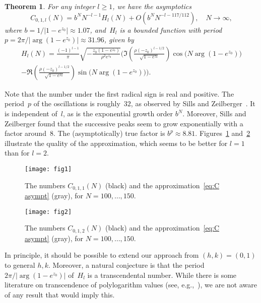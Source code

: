 \documentclass[a4paper]{amsart}
\newtheorem{theorem}{Theorem}
\begin{document}
\begin{theorem}\label{thm:main}
    For any integer $l\geq1$, we have the asymptotics
    \begin{equation}\label{eq:C asympt}
        C_{0,1,l}(N) = b^N N^{-l-1} H_l(N) + O(b^N N^{-l-117/112}), \quad N\to\infty, 
    \end{equation}
    where $b=1/|1-e^{z_0}|\approx 1.07$, and~$H_l$ is a bounded function with period
   $p=2\pi/|\arg(1-e^{z_0})|\approx 31.96$, given by
   \begin{multline*}
       H_l(N) = \frac{(-1)^{l-1}}{\pi} 
       \sqrt{-\frac {z_0(1-e^{z_0})}{\rho^2e^{z_0}}}
       \Bigg(\Im\left( \frac{\rho(-z_0)^{l-1/2}}{\sqrt{1-e^{z_0}}}\right)\cos\big(N \arg(1-e^{z_0})\big) \\
        -\Re\left(\frac{\rho(-z_0)^{l-1/2}}{\sqrt{1-e^{z_0}}}\right)\sin\big(N \arg(1-e^{z_0})\big)\Bigg).
   \end{multline*}
\end{theorem}
%
Note that the number under the first radical sign is real and positive.
The period~$p$
of the oscillations is roughly~$32$, as observed by Sills and
Zeilberger~\cite{SiZe13}. It is independent of~$l$, as is the
exponential growth order $b^N$. Moreover, Sills and Zeilberger
found that the successive peaks seem to grow exponentially with
a factor around~$8$. The (asymptotically) true factor
is $b^p\approx 8.81$.
Figures~\ref{fig:1} and~\ref{fig:2} illustrate the quality of the approximation,
which seems to be better for $l=1$ than for $l=2$.
%
\begin{figure}
\begin{center}
\texttt{[image: fig1]}
\end{center}
\caption{\label{fig:1}The numbers $C_{0,1,1}(N)$ (black)
and the approximation~\eqref{eq:C asympt} (gray), for
$N=100,\dots,150$.}
\end{figure}
%
\begin{figure}
\begin{center}
\texttt{[image: fig2]}
\end{center}
\caption{\label{fig:2}The numbers $C_{0,1,2}(N)$ (black)
and the approximation~\eqref{eq:C asympt} (gray), for
$N=100,\dots,150$.}
\end{figure}

In principle, it should be possible to extend our approach
from $(h,k)=(0,1)$ to general $h,k$.
Moreover, a natural conjecture is that the period $2\pi/|\arg(1-e^{z_0})|$
of~$H_l$ is a transcendental number.
While there is some literature on transcendence of polylogarithm values
(see, e.g.,~\cite{Ha93}), we are not aware of any result that would imply this.
\end{document}

